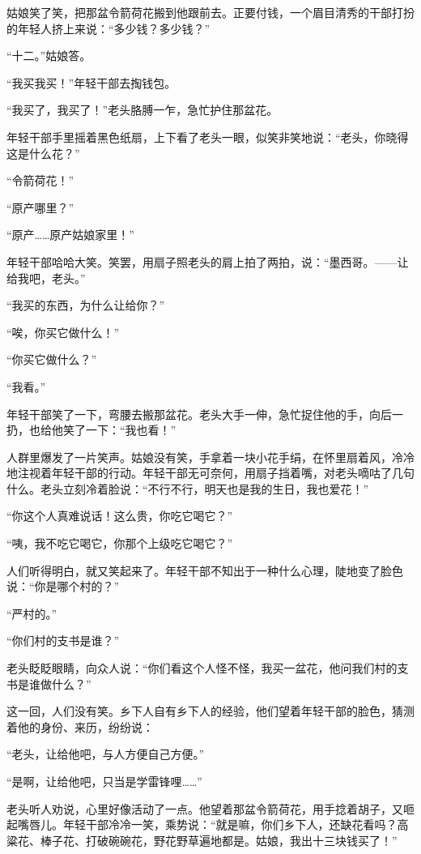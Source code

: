 \documentclass[12pt,UTF-8,openany]{ctexbook}
\begin{document}
\begin{normalsize}
    姑娘笑了笑，把那盆令箭荷花搬到他跟前去。正要付钱，一个眉目清秀的干部打扮的年轻人挤上来说：“多少钱？多少钱？”
    
    “十二。”姑娘答。
    
    “我买我买！”年轻干部去掏钱包。
    
    “我买了，我买了！”老头胳膊一乍，急忙护住那盆花。
    
    年轻干部手里摇着黑色纸扇，上下看了老头一眼，似笑非笑地说：“老头，你晓得这是什么花？”
    
    “令箭荷花！”
    
    “原产哪里？”
    
    “原产……原产姑娘家里！”
    
    年轻干部哈哈大笑。笑罢，用扇子照老头的肩上拍了两拍，说：“墨西哥。——让给我吧，老头。”
    
    “我买的东西，为什么让给你？”
    
    “唉，你买它做什么！”
    
    “你买它做什么？”
    
    “我看。”
    
    年轻干部笑了一下，弯腰去搬那盆花。老头大手一伸，急忙捉住他的手，向后一扔，也给他笑了一下：“我也看！”
    
    人群里爆发了一片笑声。姑娘没有笑，手拿着一块小花手绢，在怀里扇着风，冷冷地注视着年轻干部的行动。年轻干部无可奈何，用扇子挡着嘴，对老头嘀咕了几句什么。老头立刻冷着脸说：“不行不行，明天也是我的生日，我也爱花！”
    
    “你这个人真难说话！这么贵，你吃它喝它？”
    
    “咦，我不吃它喝它，你那个上级吃它喝它？”
    
    人们听得明白，就又笑起来了。年轻干部不知出于一种什么心理，陡地变了脸色说：“你是哪个村的？”
    
    “严村的。”
    
    “你们村的支书是谁？”
    
    老头眨眨眼睛，向众人说：“你们看这个人怪不怪，我买一盆花，他问我们村的支书是谁做什么？”
    
    这一回，人们没有笑。乡下人自有乡下人的经验，他们望着年轻干部的脸色，猜测着他的身份、来历，纷纷说：
    
    “老头，让给他吧，与人方便自己方便。”
    
    “是啊，让给他吧，只当是学雷锋哩……”
    
    老头听人劝说，心里好像活动了一点。他望着那盆令箭荷花，用手捻着胡子，又咂起嘴唇儿。年轻干部冷冷一笑，乘势说：“就是嘛，你们乡下人，还缺花看吗？高粱花、棒子花、打破碗碗花，野花野草遍地都是。姑娘，我出十三块钱买了！”
    

\end{normalsize}
\end{document}
